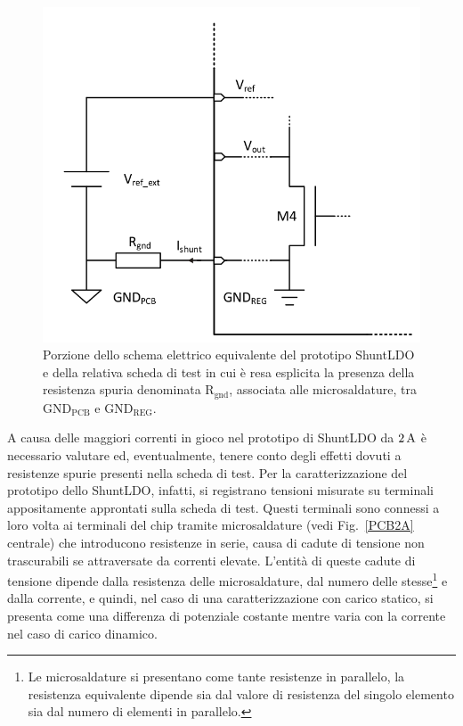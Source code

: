 \begin{figure}[!ht]
\centering
\includegraphics[scale=.3]{Immagini/Ground}
\caption{Porzione dello schema elettrico equivalente del prototipo ShuntLDO e della relativa scheda di test in cui \`e resa esplicita la presenza della resistenza spuria denominata $\mathrm{R_{gnd}}$, associata alle microsaldature, tra $\mathrm{GND_{PCB}}$ e $\mathrm{GND_{REG}}$.}
\label{Ground}
\end{figure}
A causa delle maggiori correnti in gioco nel prototipo di ShuntLDO da $2\rm \, A$ \`e necessario valutare ed, eventualmente, tenere conto degli effetti dovuti a resistenze spurie presenti nella scheda di test. Per la caratterizzazione del prototipo dello ShuntLDO, infatti, si registrano tensioni misurate su terminali appositamente approntati sulla scheda di test. 
Questi terminali sono connessi a loro volta ai terminali del chip tramite microsaldature (vedi Fig.~\ref{PCB2A} centrale) che introducono resistenze in serie, causa di cadute di tensione non trascurabili se attraversate da correnti elevate.
L'entità di queste cadute di tensione dipende dalla resistenza delle microsaldature, dal numero delle stesse\footnote{Le microsaldature si presentano come tante resistenze in parallelo, la resistenza equivalente dipende sia dal valore di resistenza del singolo elemento sia dal numero di elementi in parallelo.} e dalla corrente, e quindi, nel caso di una caratterizzazione con carico statico, si presenta come una differenza di potenziale costante mentre varia con la corrente nel caso di carico dinamico.
